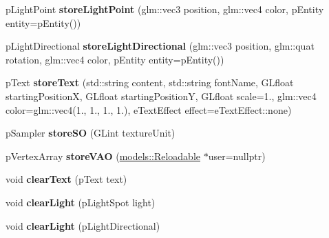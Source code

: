 \begin{DoxyCompactItemize}
\item 
\hypertarget{classfillwave_1_1Engine_a46cb84111218f318dbc2f1143f4ee277}{}p\+Light\+Point {\bfseries store\+Light\+Point} (glm\+::vec3 position, glm\+::vec4 color, p\+Entity entity=p\+Entity())\label{classfillwave_1_1Engine_a46cb84111218f318dbc2f1143f4ee277}

\item 
\hypertarget{classfillwave_1_1Engine_a3b70a285ba9d5e912d71e1ba504b2880}{}p\+Light\+Directional {\bfseries store\+Light\+Directional} (glm\+::vec3 position, glm\+::quat rotation, glm\+::vec4 color, p\+Entity entity=p\+Entity())\label{classfillwave_1_1Engine_a3b70a285ba9d5e912d71e1ba504b2880}

\item 
\hypertarget{classfillwave_1_1Engine_a96be4bcbb09810e004ca585fde819b68}{}p\+Text {\bfseries store\+Text} (std\+::string content, std\+::string font\+Name, G\+Lfloat starting\+Position\+X, G\+Lfloat starting\+Position\+Y, G\+Lfloat scale=1., glm\+::vec4 color=glm\+::vec4(1., 1., 1., 1.), e\+Text\+Effect effect=e\+Text\+Effect\+::none)\label{classfillwave_1_1Engine_a96be4bcbb09810e004ca585fde819b68}

\item 
\hypertarget{classfillwave_1_1Engine_ae3619e901e208d1c61ebced3b18997e3}{}p\+Sampler {\bfseries store\+S\+O} (G\+Lint texture\+Unit)\label{classfillwave_1_1Engine_ae3619e901e208d1c61ebced3b18997e3}

\item 
\hypertarget{classfillwave_1_1Engine_a40bb53bfae5e06d4238f5a07c4f30a87}{}p\+Vertex\+Array {\bfseries store\+V\+A\+O} (\hyperlink{classfillwave_1_1models_1_1Reloadable}{models\+::\+Reloadable} $\ast$user=nullptr)\label{classfillwave_1_1Engine_a40bb53bfae5e06d4238f5a07c4f30a87}

\item 
\hypertarget{classfillwave_1_1Engine_a1f7390160abe6d9ef530b27ac8180017}{}void {\bfseries clear\+Text} (p\+Text text)\label{classfillwave_1_1Engine_a1f7390160abe6d9ef530b27ac8180017}

\item 
\hypertarget{classfillwave_1_1Engine_a487281fb62a0e3469759afb0ad0f4708}{}void {\bfseries clear\+Light} (p\+Light\+Spot light)\label{classfillwave_1_1Engine_a487281fb62a0e3469759afb0ad0f4708}

\item 
\hypertarget{classfillwave_1_1Engine_a68cf4c1c889f24ac5f7d39a26e3a0c7d}{}void {\bfseries clear\+Light} (p\+Light\+Directional)\label{classfillwave_1_1Engine_a68cf4c1c889f24ac5f7d39a26e3a0c7d}


\end{DoxyCompactItemize}
